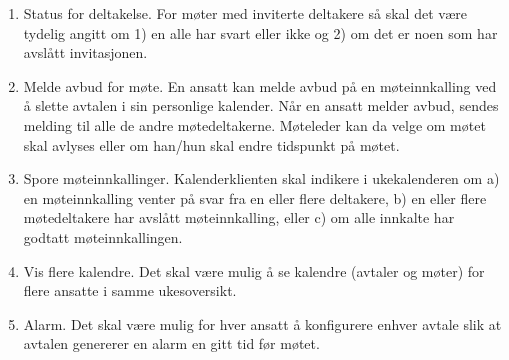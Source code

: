 \begin{enumerate}
\item
Status for deltakelse. For møter med inviterte deltakere så skal det være tydelig angitt om 1) en alle har svart eller ikke og 2) om det er noen som har avslått invitasjonen.

\item
Melde avbud for møte. En ansatt kan melde avbud på en møteinnkalling ved å slette avtalen i sin personlige kalender. Når en ansatt melder avbud, sendes melding til alle de andre møtedeltakerne. Møteleder kan da velge om møtet skal avlyses eller om han/hun skal endre tidspunkt på møtet.

\item
Spore møteinnkallinger. Kalenderklienten skal indikere i ukekalenderen om a) en møteinnkalling venter på svar fra en eller flere deltakere, b) en eller flere møtedeltakere har avslått møteinnkalling, eller c) om alle innkalte har godtatt møteinnkallingen.

\item
Vis flere kalendre. Det skal være mulig å se kalendre (avtaler og møter) for flere ansatte i samme ukesoversikt.

\item
Alarm. Det skal være mulig for hver ansatt å konfigurere enhver avtale slik at avtalen genererer en alarm en gitt tid før møtet. 

\end{enumerate}
